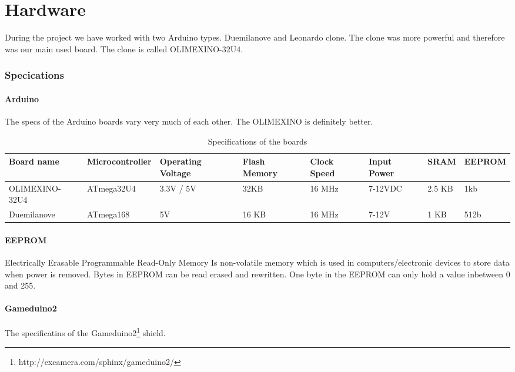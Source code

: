 \chapter{Hardware} %

During the project we have worked with two Arduino types. Duemilanove and Leonardo clone.
The clone was more powerful and therefore was our main used board. The clone is called
OLIMEXINO-32U4.
\subsection{Specications}

\subsubsection{Arduino}
The specs of the Arduino boards vary very much of each other. The OLIMEXINO is definitely
better.

\begin{table}[h]
\resizebox{16cm}{!} {
    \begin{tabular}{l|l|l|l|l|l|l|l}
    Board name     & Microcontroller & Operating Voltage & Flash Memory & Clock Speed & Input Power & SRAM & EEPROM  \\ \hline
    OLIMEXINO-32U4 & ATmega32U4      & 3.3V / 5V         & 32KB         & 16 MHz      & 7-12VDC     & 2.5 KB & 1kb \\
    Duemilanove    & ATmega168       & 5V                & 16 KB        & 16 MHz      & 7-12V       & 1 KB& 512b   \\
    \end{tabular}
}
    \caption{Specifications of the boards}
\end{table}
\subsubsection*{EEPROM}
Electrically Erasable Programmable Read-Only Memory Is non-volatile memory which is used in computers/electronic devices to store data when power is removed. Bytes in EEPROM can be read erased and rewritten. One byte in the EEPROM can only hold a value inbetween 0 and 255.

\newpage
\subsubsection{Gameduino2}
The specificatins of the Gameduino2\footnote{http://excamera.com/sphinx/gameduino2/} shield.

